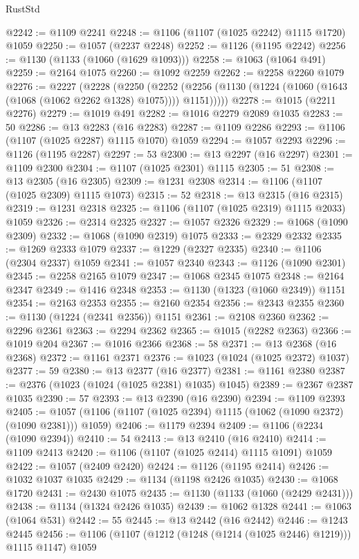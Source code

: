\begin{lexlean}{RustStd}
\begin{coremodule}
@2242 := @1109 @2241
@2248 := @1106 (@1107 (@1025 @2242) @1115 @1720) @1059
@2250 := @1057 (@2237 @2248)
@2252 := @1126 (@1195 @2242)
@2256 := @1130 (@1133 (@1060 (@1629 @1093)))
@2258 := @1063 (@1064 @491)
@2259 := @2164 @1075
@2260 := @1092 @2259
@2262 := @2258 @2260 @1079
@2276 := @2227
    (@2228
      (@2250
        (@2252 (@2256 (@1130 (@1224 (@1060 (@1643 (@1068 (@1062 @2262 @1328) @1075)))) @1151)))))
@2278 := @1015 (@2211 @2276)
@2279 := @1019 @491
@2282 := @1016 @2279 @2089 @1035
@2283 := 50
@2286 := @13 @2283 (@16 @2283)
@2287 := @1109 @2286
@2293 := @1106 (@1107 (@1025 @2287) @1115 @1070) @1059
@2294 := @1057 @2293
@2296 := @1126 (@1195 @2287)
@2297 := 53
@2300 := @13 @2297 (@16 @2297)
@2301 := @1109 @2300
@2304 := @1107 (@1025 @2301) @1115
@2305 := 51
@2308 := @13 @2305 (@16 @2305)
@2309 := @1231 @2308
@2314 := @1106 (@1107 (@1025 @2309) @1115 @1073)
@2315 := 52
@2318 := @13 @2315 (@16 @2315)
@2319 := @1231 @2318
@2325 := @1106 (@1107 (@1025 @2319) @1115 @2033) @1059
@2326 := @2314 @2325
@2327 := @1057 @2326
@2329 := @1068 (@1090 @2309)
@2332 := @1068 (@1090 @2319) @1075
@2333 := @2329 @2332
@2335 := @1269 @2333 @1079
@2337 := @1229 (@2327 @2335)
@2340 := @1106 (@2304 @2337) @1059
@2341 := @1057 @2340
@2343 := @1126 (@1090 @2301)
@2345 := @2258 @2165 @1079
@2347 := @1068 @2345 @1075
@2348 := @2164 @2347
@2349 := @1416 @2348
@2353 := @1130 (@1323 (@1060 @2349)) @1151
@2354 := @2163 @2353
@2355 := @2160 @2354
@2356 := @2343 @2355
@2360 := @1130 (@1224 (@2341 @2356)) @1151
@2361 := @2108 @2360
@2362 := @2296 @2361
@2363 := @2294 @2362
@2365 := @1015 (@2282 @2363)
@2366 := @1019 @204
@2367 := @1016 @2366
@2368 := 58
@2371 := @13 @2368 (@16 @2368)
@2372 := @1161 @2371
@2376 := @1023 (@1024 (@1025 @2372) @1037)
@2377 := 59
@2380 := @13 @2377 (@16 @2377)
@2381 := @1161 @2380
@2387 := @2376 (@1023 (@1024 (@1025 @2381) @1035) @1045)
@2389 := @2367 @2387 @1035
@2390 := 57
@2393 := @13 @2390 (@16 @2390)
@2394 := @1109 @2393
@2405 := @1057 (@1106 (@1107 (@1025 @2394) @1115 (@1062 (@1090 @2372) (@1090 @2381))) @1059)
@2406 := @1179 @2394
@2409 := @1106 (@2234 (@1090 @2394))
@2410 := 54
@2413 := @13 @2410 (@16 @2410)
@2414 := @1109 @2413
@2420 := @1106 (@1107 (@1025 @2414) @1115 @1091) @1059
@2422 := @1057 (@2409 @2420)
@2424 := @1126 (@1195 @2414)
@2426 := @1032 @1037 @1035
@2429 := @1134 (@1198 @2426 @1035)
@2430 := @1068 @1720
@2431 := @2430 @1075
@2435 := @1130 (@1133 (@1060 (@2429 @2431)))
@2438 := @1134 (@1324 @2426 @1035)
@2439 := @1062 @1328
@2441 := @1063 (@1064 @531)
@2442 := 55
@2445 := @13 @2442 (@16 @2442)
@2446 := @1243 @2445
@2456 := @1106 (@1107 (@1212 (@1248 (@1214 (@1025 @2446) @1219))) @1115 @1147) @1059

\end{coremodule}
\end{lexlean}
